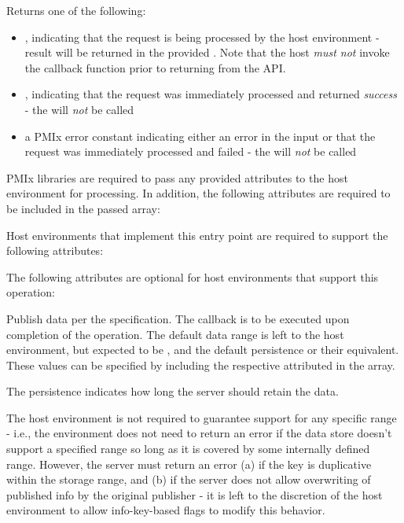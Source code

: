 Returns one of the following:

\begin{itemize}
    \item {}, indicating that the request is being processed by the host environment - result will be returned in the provided . Note that the host \emph{must not} invoke the callback function prior to returning from the \ac{API}.
    \item {}, indicating that the request was immediately processed and returned \textit{success} - the  will \textit{not} be called
    \item a PMIx error constant indicating either an error in the input or that the request was immediately processed and failed - the  will \textit{not} be called
\end{itemize}

\reqattrstart
\ac{PMIx} libraries are required to pass any provided attributes to the host environment for processing. In addition, the following attributes are required to be included in the passed  array:


Host environments that implement this entry point are required to support the following attributes:


\reqattrend

\optattrstart
The following attributes are optional for host environments that support this operation:


\optattrend

\descr

Publish data per the  specification.
The callback is to be executed upon completion of the operation.
The default data range is left to the host environment, but expected to be , and the default persistence  or their equivalent.
These values can be specified by including the respective attributed in the  array.

The persistence indicates how long the server should retain the data.

\advicermstart
The host environment is not required to guarantee support for any specific range - i.e., the environment does not need to return an error if the data store doesn't support a specified range so long as it is covered by some internally defined range.
However, the server must return an error (a) if the key is duplicative within the storage range, and (b) if the server does not allow overwriting of published info by the original publisher - it is left to the discretion of the host environment to allow info-key-based flags to modify this behavior.

